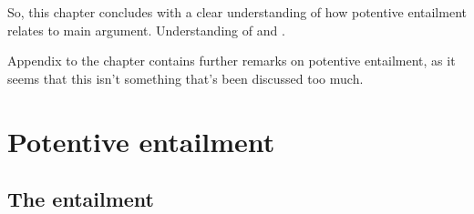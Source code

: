 \begin{note}[Wrapping up]
  So, this chapter concludes with a clear understanding of how potentive entailment relates to main argument.
  Understanding of \WR{} and \AR{}.
\end{note}

\begin{note}[Extras]
  Appendix to the chapter contains further remarks on potentive entailment, as it seems that this isn't something that's been discussed too much.
\end{note}


\section{Potentive entailment}
\label{sec:potentive-entailment}

\subsection{The entailment}
\label{sec:entailment}

